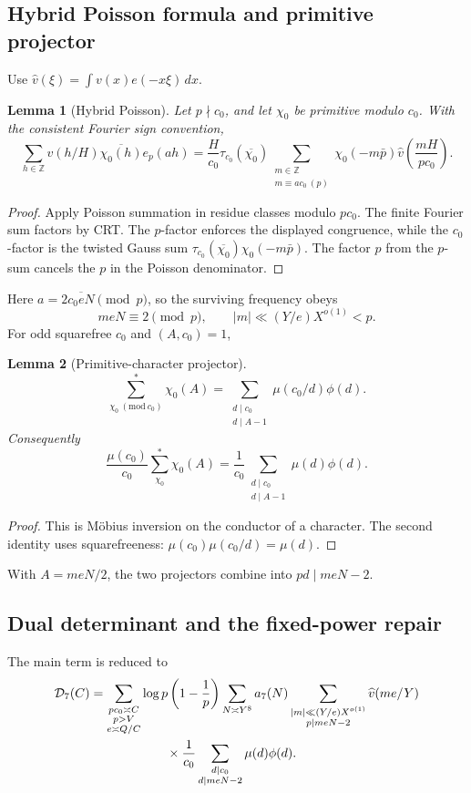 \documentclass[11pt]{article}
\newtheorem{lemma}[lemma]{Lemma}
\theoremstyle{definition}
\newcommand{\e}{\mathrm e}
\newcommand{\1}{\mathbf 1}
\begin{document}
\subsection{Hybrid Poisson formula and primitive projector}
Use $\widehat v(\xi)=\int v(x)e(-x\xi)\,dx$.
\begin{lemma}[Hybrid Poisson]
\label{lem:hybrid-poisson}
Let $p\nmid c_0$, and let $\chi_0$ be primitive modulo $c_0$.  With the
consistent Fourier sign convention,
\[
 \sum_{h\in\mathbb Z}v(h/H)\overline{\chi_0(h)}e_p(ah)
 =\frac{H}{c_0}\tau_{c_0}(\overline{\chi_0})
  \sum_{\substack{m\in\mathbb Z\\m\equiv ac_0\ (p)}}
   \chi_0(-m\bar p)\widehat v\!\left(\frac{mH}{pc_0}\right).
\]
\end{lemma}
\begin{proof}
Apply Poisson summation in residue classes modulo $pc_0$.  The finite Fourier
sum factors by CRT.  The $p$-factor enforces the displayed congruence, while
the $c_0$-factor is the twisted Gauss sum
$\tau_{c_0}(\overline{\chi_0})\chi_0(-m\bar p)$.  The factor $p$ from the
$p$-sum cancels the $p$ in the Poisson denominator.
\end{proof}
Here $a=2\overline{c_0eN}\pmod p$, so the surviving frequency obeys
\[
   meN\equiv2\pmod p,
   \qquad |m|\ll(Y/e)X^{o(1)}<p.
\]
For odd squarefree $c_0$ and $(A,c_0)=1$,
\begin{lemma}[Primitive-character projector]
\label{lem:primitive-projector}
\[
  \sum_{\chi_0\ (\mathrm{mod}\ c_0)}^*\chi_0(A)
  =\sum_{\substack{d\mid c_0\\d\mid A-1}}
     \mu(c_0/d)\phi(d).
\]
Consequently
\[
 \frac{\mu(c_0)}{c_0}
 \sum_{\chi_0}^*\chi_0(A)
 =\frac1{c_0}
  \sum_{\substack{d\mid c_0\\d\mid A-1}}\mu(d)\phi(d).
\]
\end{lemma}
\begin{proof}
This is Möbius inversion on the conductor of a character.  The second identity
uses squarefreeness: $\mu(c_0)\mu(c_0/d)=\mu(d)$.
\end{proof}
With $A=meN/2$, the two projectors combine into $pd\mid meN-2$.

\subsection{Dual determinant and the fixed-power repair}
The main term is reduced to
\begin{align}
 \mathcal D_7(C)=
 \sum_{\substack{pc_0\asymp C\\p>V\\e\asymp Q/C}}
 &\log p\left(1-\frac1p\right)
 \sum_{N\asymp Y^8}a_7(N)
 \sum_{\substack{|m|\ll(Y/e)X^{o(1)}\\p\mid meN-2}}
 \widehat v(me/Y) \notag\\
 &\qquad\times\frac1{c_0}
 \sum_{\substack{d\mid c_0\\d\mid meN-2}}\mu(d)\phi(d).
 \label{eq:D7}
\end{align}
\end{document}
